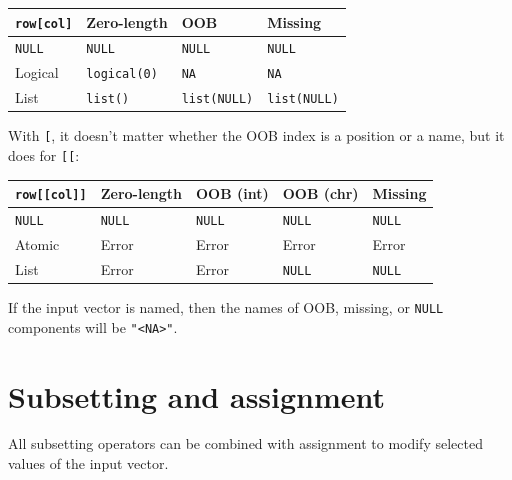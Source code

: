 \documentclass[]{book}
\theoremstyle{definition}
\theoremstyle{definition}
\theoremstyle{definition}
\theoremstyle{remark}
\begin{document}
\begin{longtable}[]{@{}llll@{}}
\toprule
\texttt{row{[}col{]}} & Zero-length & OOB & Missing\tabularnewline
\midrule
\endhead
\texttt{NULL} & \texttt{NULL} & \texttt{NULL} &
\texttt{NULL}\tabularnewline
Logical & \texttt{logical(0)} & \texttt{NA} & \texttt{NA}\tabularnewline
List & \texttt{list()} & \texttt{list(NULL)} &
\texttt{list(NULL)}\tabularnewline
\bottomrule
\end{longtable}

With \texttt{{[}}, it doesn't matter whether the OOB index is a position
or a name, but it does for \texttt{{[}{[}}:

\begin{longtable}[]{@{}lllll@{}}
\toprule
\texttt{row{[}{[}col{]}{]}} & Zero-length & OOB (int) & OOB (chr) &
Missing\tabularnewline
\midrule
\endhead
\texttt{NULL} & \texttt{NULL} & \texttt{NULL} & \texttt{NULL} &
\texttt{NULL}\tabularnewline
Atomic & Error & Error & Error & Error\tabularnewline
List & Error & Error & \texttt{NULL} & \texttt{NULL}\tabularnewline
\bottomrule
\end{longtable}

If the input vector is named, then the names of OOB, missing, or
\texttt{NULL} components will be \texttt{"\textless{}NA\textgreater{}"}.

\section{Subsetting and assignment}\label{subassignment}

All subsetting operators can be combined with assignment to modify
selected values of the input vector.
\end{document}
